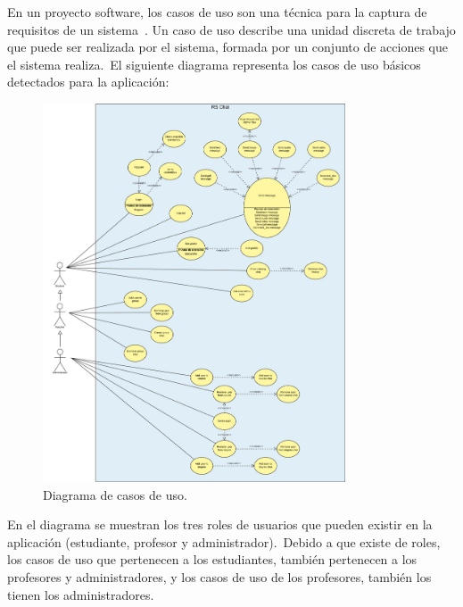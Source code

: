 
En un proyecto software, los casos de uso son una técnica para la captura de requisitos de un sistema~\cite{use_cases}.
Un caso de uso describe una unidad discreta de trabajo que puede ser realizada por el sistema, formada por un conjunto
de acciones que el sistema realiza.\ El siguiente diagrama representa los casos de uso básicos detectados para
la aplicación:

\begin{figure}[H]
	\centering
	\includegraphics[width=0.8\textwidth]{res/images/RSChat-Diagrams-Usecases}
	\caption{Diagrama de casos de uso.}
	\label{fig:casosDeUso}
\end{figure}

En el diagrama se muestran los tres roles de usuarios que pueden existir en la aplicación (estudiante, profesor y
administrador).\ Debido a que existe  de roles, los casos de uso que pertenecen a los estudiantes,
también pertenecen a los profesores y administradores, y los casos de uso de los profesores, también los
tienen los administradores.

